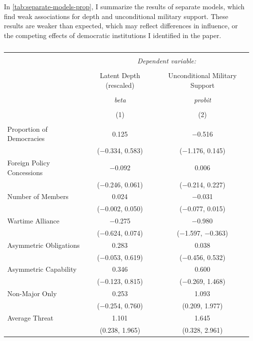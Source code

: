 \documentclass[12pt]{article}
\begin{document}
In \autoref{tab:separate-models-prop}, I summarize the results of separate models, which find weak associations for depth and unconditional military support. 
These results are weaker than expected, which may reflect differences in influence, or the competing effects of democratic institutions I identified in the paper. 


\begin{table}[!htbp] \centering 
  \caption{} 
  \label{tab:separate-models-prop} 
\begin{tabular}{@{\extracolsep{5pt}}lcc} 
\\[-1.8ex]\hline 
\hline \\[-1.8ex] 
 & \multicolumn{2}{c}{\textit{Dependent variable:}} \\ 
\cline{2-3} 
\\[-1.8ex] & Latent Depth (rescaled) & Unconditional Military Support \\ 
\\[-1.8ex] & \textit{beta} & \textit{probit} \\ 
\\[-1.8ex] & (1) & (2)\\ 
\hline \\[-1.8ex] 
 Proportion of Democracies & 0.125 & $-$0.516 \\ 
  & ($-$0.334, 0.583) & ($-$1.176, 0.145) \\ 
  Foreign Policy Concessions & $-$0.092 & 0.006 \\ 
  & ($-$0.246, 0.061) & ($-$0.214, 0.227) \\ 
  Number of Members & 0.024$^{}$ & $-$0.031 \\ 
  & ($-$0.002, 0.050) & ($-$0.077, 0.015) \\ 
  Wartime Alliance & $-$0.275 & $-$0.980$^{}$ \\ 
  & ($-$0.624, 0.074) & ($-$1.597, $-$0.363) \\ 
  Asymmetric Obligations & 0.283$^{}$ & 0.038 \\ 
  & ($-$0.053, 0.619) & ($-$0.456, 0.532) \\ 
  Asymmetric Capability & 0.346 & 0.600 \\ 
  & ($-$0.123, 0.815) & ($-$0.269, 1.468) \\ 
  Non-Major Only & 0.253 & 1.093$^{}$ \\ 
  & ($-$0.254, 0.760) & (0.209, 1.977) \\ 
  Average Threat & 1.101$^{}$ & 1.645$^{}$ \\ 
  & (0.238, 1.965) & (0.328, 2.961) \\ 

\end{tabular}
\end{table}
\end{document}
